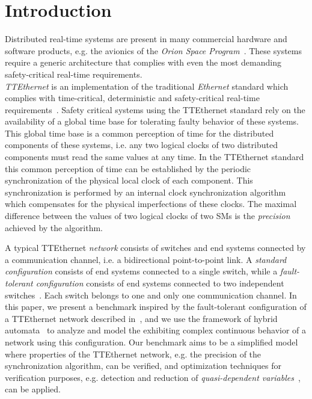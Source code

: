 \section{Introduction}
\label{sec:intro}

Distributed real-time systems are present in many commercial hardware and software 
products, e.g. the avionics of the \emph{Orion Space Program}~\cite{Howard}. 
These systems require a generic architecture that complies with
even the most demanding safety-critical real-time requirements.\\ 
\emph{TTEthernet} is an implementation of the traditional \emph{Ethernet} standard
which complies with time-critical, deterministic and safety-critical real-time requirements~\cite{Kopetz}. 
Safety critical systems using the TTEthernet standard rely on the availability 
of a global time base for tolerating faulty behavior of these systems.  
This global time base is a common perception of time for the distributed components of these systems,  
i.e. any two logical clocks of two distributed components must read the same values at any time.
In the TTEthernet standard this common perception of time can be established by 
the periodic synchronization of the physical local clock of each component. 
This synchronization is performed by an internal clock synchronization algorithm~\cite{Kopetz} 
which compensates for the physical
imperfections of these clocks. The maximal difference between the values of 
two logical clocks of two SMs is the \emph{precision} achieved by the algorithm.

A typical TTEthernet \emph{network} consists of switches and end systems connected by a communication channel,
i.e. a bidirectional point-to-point link. A \emph{standard configuration} consists of end systems 
connected to a single switch, while a \emph{fault-tolerant configuration} consists of end systems 
connected to two independent switches~\cite{Kopetz}. 
Each switch belongs to one and only one communication channel. 
%
In this paper, we present a benchmark inspired by the fault-tolerant configuration 
of a TTEthernet network described in~\cite{Steiner2}, and we use the framework of
hybrid automata~\cite{Alur2,bogomolov-etal:spin2013,bogomolov-etal:cav2012-intro} to analyze and model the exhibiting complex continuous behavior
of a network using this configuration. Our benchmark aims to be a simplified model
where properties of the TTEthernet network, e.g. the precision of the synchronization algorithm, can be verified, and
optimization techniques for verification purposes, e.g. detection and 
reduction of \emph{quasi-dependent variables}~\cite{Herrera3}, can be applied. 

